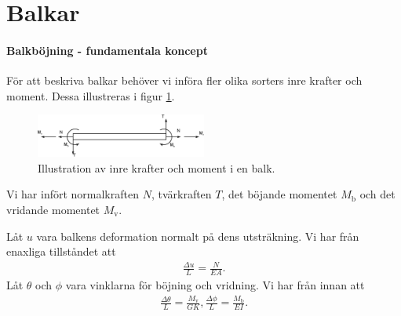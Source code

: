 \section{Balkar}

\paragraph{Balkböjning - fundamentala koncept}
För att beskriva balkar behöver vi införa fler olika sorters inre krafter och moment. Dessa illustreras i figur \ref{fig:beam_forces}.
\begin{figure}[!ht]
	\centering
	\includegraphics[width = 0.5\textwidth]{./Images/beam_forces.eps}
	\caption{Illustration av inre krafter och moment i en balk.}
	\label{fig:beam_forces}
\end{figure}
Vi har infört normalkraften $N$, tvärkraften $T$, det böjande momentet $M_{\text{b}}$ och det vridande momentet $M_{\text{v}}$.

Låt $u$ vara balkens deformation normalt på dens utsträkning. Vi har från enaxliga tillståndet att
\begin{align*}
	\frac{\Delta u}{L} = \frac{N}{EA}.
\end{align*}
Låt $\theta$ och $\phi$ vara vinklarna för böjning och vridning. Vi har från innan att
\begin{align*}
	\frac{\Delta\theta}{L} = \frac{M_{\text{v}}}{GK},
	\frac{\Delta\phi}{L} = \frac{M_{\text{b}}}{EI}.
\end{align*}

